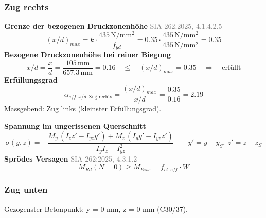 \documentclass[11pt,a4paper]{article}
\newcommand{\normref}[1]{{\small\textcolor{gray}{#1}}}
\begin{document}
\subsubsection{Zug rechts}
\noindent\textbf{Grenze der bezogenen Druckzonenhöhe} \hfill \normref{SIA 262:2025, 4.1.4.2.5}
\begin{equation*}
\left(x/d\right)_{max} = k \cdot \frac{435\,\mathrm{N/mm^2}}{f_{yd}} = 0.35 \cdot \frac{435\,\mathrm{N/mm^2}}{435\,\mathrm{N}/\mathrm{mm}^{2}} = 0.35
\end{equation*}
\noindent\textbf{Bezogene Druckzonenhöhe bei reiner Biegung}
\begin{equation*}
x/d = \frac{x}{d} = \frac{105\,\mathrm{mm}}{657.3\,\mathrm{mm}} = 0.16 \quad \le \quad \left(x/d\right)_{max} = 0.35 \quad \Rightarrow \quad \text{erfüllt}
\end{equation*}
\noindent\textbf{Erfüllungsgrad}
\begin{equation*}
\alpha_{eff,x/d,\text{Zug rechts}} = \frac{\left(x/d\right)_{max}}{x/d} = \frac{0.35}{0.16} = 2.19
\end{equation*}
Massgebend: Zug links (kleinster Erfüllungsgrad).

\noindent\textbf{Spannung im ungerissenen Querschnitt}
\begin{equation*}
\sigma(y, z) = -\frac{M_y\,(I_z z' - I_{yz} y') + M_z\,(I_y y' - I_{yz} z')}{I_y I_z - I_{yz}^2}\qquad y' = y - y_S,\ z' = z - z_S
\end{equation*}
\noindent\textbf{Sprödes Versagen} \hfill \normref{SIA 262:2025, 4.3.1.2}
\begin{equation*}
M_{Rd}(N = 0) \ge M_{Riss} = f_{ct,eff} \cdot W
\end{equation*}
\subsubsection{Zug unten}
Gezogenster Betonpunkt: y = 0 mm, z = 0 mm (C30/37).
\end{document}
